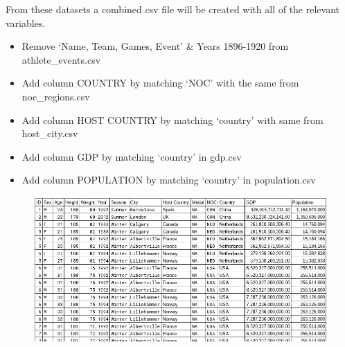 \documentclass[a4 paper, 12pt]{memoir}
\begin{document}
    \smallskip
    From these datasets a combined csv file will be created with all of the relevant variables.
    \begin{itemize}
        \item Remove ‘Name, Team, Games, Event’ \& Years 1896-1920 from athlete\_events.csv
        \item Add column COUNTRY by matching ‘NOC’ with the same from noc\_regions.csv
        \item Add column HOST COUNTRY by matching ‘country’ with same from host\_city.csv
        \item Add column GDP by matching ‘country’ in gdp.csv
        \item Add column POPULATION by matching ‘country’ in population.csv  
    \end{itemize}

    \begin{figure} [H]
        \centering
        \includegraphics[width=\textwidth, frame]
            {../images/new_data.png}                    
    \end{figure} 
\end{document}
